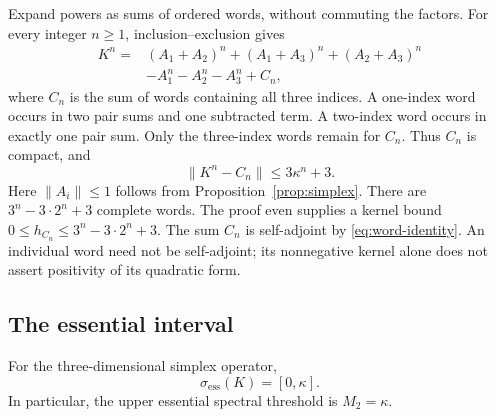 \documentclass[11pt]{article}
\newcommand{\norm}[1]{\lVert #1\rVert}
\begin{document}
Expand powers as sums of ordered words, without commuting the factors.
For every integer $n\geq1$, inclusion--exclusion gives
\begin{equation}\label{eq:word-identity}
 \begin{split}
 K^n={}&(A_1+A_2)^n+(A_1+A_3)^n+(A_2+A_3)^n\\
      &-A_1^n-A_2^n-A_3^n+C_n,
 \end{split}
\end{equation}
where $C_n$ is the sum of words containing all three indices.
A one-index word occurs in two pair sums and one subtracted term.
A two-index word occurs in exactly one pair sum.
Only the three-index words remain for $C_n$.
Thus $C_n$ is compact, and
\begin{equation}\label{eq:remainder-bound}
          \norm{K^n-C_n}\leq3\kappa^n+3.
\end{equation}
Here $\norm{A_i}\leq1$ follows from Proposition~\ref{prop:simplex}.
There are $3^n-3\cdot2^n+3$ complete words.
The proof even supplies a kernel bound
$0\leq h_{C_n}\leq3^n-3\cdot2^n+3$.
The sum $C_n$ is self-adjoint by \eqref{eq:word-identity}.
An individual word need not be self-adjoint; its nonnegative kernel
alone does not assert positivity of its quadratic form.

\subsection{The essential interval}

\begin{theorem}\label{thm:essential}
For the three-dimensional simplex operator,
\[
                         \sigma_{\mathrm{ess}}(K)=[0,\kappa].
\]
In particular, the upper essential spectral threshold is $M_2=\kappa$.
\end{theorem}
\end{document}
